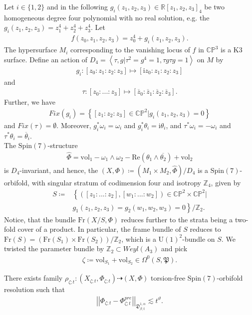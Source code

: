 \documentclass[psamsfonts]{amsart}
\theoremstyle{plain}
\theoremstyle{definition}{
\newtheorem{defi}{Definition}[section]
\newtheorem{ass}{Assumption}
\newtheorem*{nota}{Notation}}
\theoremstyle{remark}{
\newtheorem{rem}{Remark}
\newtheorem{ex}{Example}}
\theoremstyle{plain}{
\newtheorem{thm}{Theorem}[section]
\newtheorem{lem}{Lemma}[section]
\newtheorem{cor}{Corollary}[section]
\newtheorem{prop}{Proposition}[section]
\newtheorem{con}{Conjecture}[section]}
\newcommand{\m}[1]{{\mathrm{#1}}}
\begin{document}
\begin{ex}
Let $i\in\{1,2\}$ and in the following $g_i(z_1,z_2,z_3)\in \mathbb{R}[z_1,z_2,z_3]_4$ be two homogeneous degree four polynomial with no real solution, e.g. the $g_i(z_1,z_2,z_3)=z_1^4+z_2^4+z_3^4$. Let 
\begin{align*}
    f(z_0,z_1,z_2,z_3)=z_0^4+g_i(z_1,z_2,z_3).
\end{align*}
The hypersurface $M_i$ corresponding to the vanishing locus of $f$ in $\mathbb{CP}^3$ is a K3 surface. Define an action of $D_4=\left<\tau,g|\tau^2=g^4=1,\tau g\tau g=1\right>$ on $M$ by 
\begin{align*}
    g_i\colon [z_0:z_1:z_2:z_3]\mapsto [\m{i}z_0:z_1:z_2:z_3]
\end{align*}
and 
\begin{align*}
    \tau\colon [z_0:...:z_3]\mapsto[\overline{z}_0 \colon\overline{z}_1 \colon\overline{z}_2 \colon\overline{z}_3].
\end{align*}
Further, we have
\begin{align*}
    Fix(g_i)=\left\{[z_1:z_2:z_3]\in \mathbb{CP}^2|g_i(z_1,z_2,z_3)=0\right\}
\end{align*}
and $Fix(\tau)=\emptyset$. Moreover, $g_i^*\omega_i=\omega_i$ and $g_i^*\theta_i=\m{i}\theta_i$, and $\tau^*\omega_i=-\omega_i$ and $\tau^*\theta_i=\overline{\theta}_i$.\\

The $\m{Spin}(7)$-structure 
    \begin{align*}
        \hat{\Phi}=\m{vol}_1-\omega_1\wedge\omega_2-\m{Re}(\theta_1\wedge\overline{\theta_2})+\m{vol}_2
    \end{align*}
is $D_4$-invariant, and hence, the $(X,\Phi)\coloneqq(M_1\times M_2,\hat{\Phi})/D_4$ is a $\m{Spin}(7)$-orbifold, with singular stratum of codimension four and isotropy $\mathbb{Z}_4$, given by 
\begin{align*}
    S\coloneqq &\left\{([z_1:...:z_2],[w_1:...:w_2])\in\mathbb{CP}^2\times \mathbb{CP}^2|\right.\\
    &\left.g_1(z_1,z_2,z_3)=g_2(w_1,w_2,w_3)=0\right\}/\mathbb{Z}_2.
\end{align*}
Notice, that the bundle $\m{Fr}(X/S,\Phi)$ reduces further to the strata being a two-fold cover of a product. In particular, the frame bundle of $S$ reduces to $\m{Fr}(S)=(\m{Fr}(S_1)\times \m{Fr}(S_2))/\mathbb{Z}_2$, which is a $\m{U}(1)^2$-bundle on $S$. We twisted the parameter bundle by $\mathbb{Z}_2\subset Weyl(A_3)$ and pick 
\begin{align*}
    \zeta\coloneqq \m{vol}_{S_1}+\m{vol}_{S_2}\in \Omega^0(S,\mathfrak{P}). 
\end{align*}
\end{ex}
\begin{lem}
    There exists family $\rho_{\zeta;t}\colon (X_{\zeta;t},\Phi_{\zeta;t})\dashrightarrow (X,\Phi)$ torsion-free $\m{Spin}(7)$-orbifold resolution such that 
\begin{align*}
    \left|\left|\Phi_{\zeta;t}-\Phi^{pre}_{\zeta;t}\right|\right|_{\mathfrak{D}^{1,\alpha}_{\beta;t}}\lesssim t^{\vartheta}.
\end{align*}
\end{lem}
\end{document}
